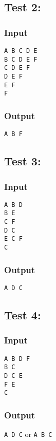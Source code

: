 \documentclass[9pt]{extarticle}
\begin{document}
\begin{multicols}{2}
\subsection*{Test 2:}
\subsubsection*{Input}
\texttt{A B C D E\\
B C D E F\\
C D E F\\
D E F\\
E F\\
F}

\subsubsection*{Output}
\texttt{A B F}

\subsection*{Test 3:}
\subsubsection*{Input}
\texttt{A B D\\
B E\\
C F\\
D C\\
E C F\\
C}

\subsubsection*{Output}
\texttt{A D C}

\subsection*{Test 4:}
\subsubsection*{Input}
\texttt{A B D F\\
B C\\
D C E\\
F E\\
C}

\subsubsection*{Output}
\texttt{A D C}
or
\texttt{A B C}


\end{multicols}
\end{document}
